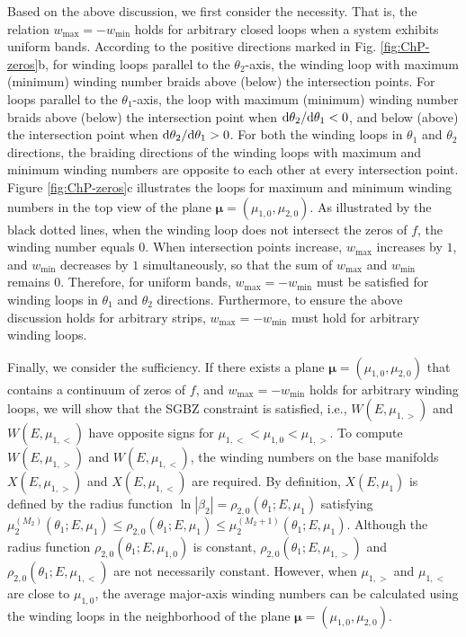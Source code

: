 \documentclass[pdflatex,sn-nature, iicol]{sn-jnl}%
\theoremstyle{thmstyleone}%
\theoremstyle{thmstyletwo}%
\theoremstyle{thmstylethree}%
\begin{document}
Based on the above discussion, we first consider the necessity. That
is, the relation $w_{\text{max}}=-w_{\text{min}}$ holds for arbitrary
closed loops when a system exhibits uniform bands. According to the
positive directions marked in Fig. \ref{fig:ChP-zeros}b, for winding
loops parallel to the $\theta_{2}$-axis, the winding loop with maximum
(minimum) winding number braids above (below) the intersection points.
For loops parallel to the $\theta_{1}$-axis, the loop with maximum
(minimum) winding number braids above (below) the intersection point
when $\mathrm{d}\theta_{2}/\mathrm{d}\theta_{1}<0$, and below (above) the intersection
point when $\mathrm{d}\theta_{2}/\mathrm{d}\theta_{1}>0$. For both the winding
loops in $\theta_{1}$ and $\theta_{2}$ directions, the braiding
directions of the winding loops with maximum and minimum winding numbers
are opposite to each other at every intersection point. Figure \ref{fig:ChP-zeros}c
illustrates the loops for maximum and minimum winding numbers in the
top view of the plane $\boldsymbol{\mu}=(\mu_{1,0},\mu_{2,0})$. As
illustrated by the black dotted lines, when the winding loop does
not intersect the zeros of $f$, the winding number equals $0$. When
intersection points increase, $w_{\text{max}}$ increases by $1$,
and $w_{\text{min}}$ decreases by $1$ simultaneously, so that the
sum of $w_{\text{max}}$ and $w_{\text{min}}$ remains $0$. Therefore,
for uniform bands, $w_{\text{max}}=-w_{\text{min}}$ must be satisfied
for winding loops in $\theta_{1}$ and $\theta_{2}$ directions. Furthermore,
to ensure the above discussion holds for arbitrary strips, $w_{\text{max}}=-w_{\text{min}}$
must hold for arbitrary winding loops.

Finally, we consider the sufficiency. If there exists a plane $\boldsymbol{\mu}=(\mu_{1,0},\mu_{2,0})$
that contains a continuum of zeros of $f$, and $w_{\text{max}}=-w_{\text{min}}$
holds for arbitrary winding loops, we will show that the SGBZ constraint
is satisfied, i.e., $W(E,\mu_{1,>})$ and $W(E,\mu_{1,<})$ have opposite
signs for $\mu_{1,<}<\mu_{1,0}<\mu_{1,>}$. To compute $W(E,\mu_{1,>})$
and $W(E,\mu_{1,<})$, the winding numbers on the base manifolds $X(E,\mu_{1,>})$
and $X(E,\mu_{1,<})$ are required. By definition, $X(E,\mu_{1})$
is defined by the radius function $\ln|\beta_{2}|=\rho_{2,0}(\theta_{1};E,\mu_{1})$
satisfying $\mu_{2}^{(M_{2})}(\theta_{1};E,\mu_{1})\leq\rho_{2,0}(\theta_{1};E,\mu_{1})\leq\mu_{2}^{(M_{2}+1)}(\theta_{1};E,\mu_{1})$.
Although the radius function $\rho_{2,0}(\theta_{1};E,\mu_{1,0})$
is constant, $\rho_{2,0}(\theta_{1};E,\mu_{1,>})$ and $\rho_{2,0}(\theta_{1};E,\mu_{1,<})$
are not necessarily constant. However, when $\mu_{1,>}$ and $\mu_{1,<}$
are close to $\mu_{1,0}$, the average major-axis winding numbers can be calculated
using the winding loops in the neighborhood of the plane $\boldsymbol{\mu}=(\mu_{1,0},\mu_{2,0})$.
\end{document}
